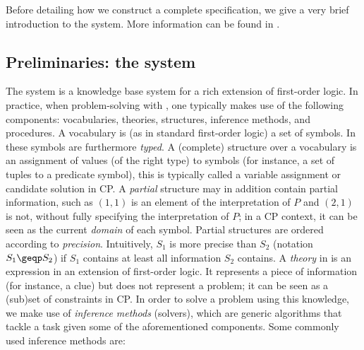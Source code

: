 Before detailing how we construct a complete specification, we give a very brief introduction to the \idp system. More information can be found in . 
\subsection{Preliminaries: the \idp system} 
The \idp system  is a knowledge base system  for a rich extension of first-order logic. 
In practice, when problem-solving with \idp, one typically makes use of the following components: vocabularies, theories, structures, inference methods, and procedures.
A vocabulary is (as in standard first-order logic) a set of symbols. In \idp these symbols are furthermore \emph{typed}. 
A (complete) structure over a vocabulary is an assignment of values (of the right type) to symbols (for instance, a set of tuples to a predicate symbol), this is typically called a variable assignment or candidate solution in CP. A \emph{partial} structure may in addition contain partial information, such as $(1,1)$ is an element of the interpretation of $P$ and $(2,1)$ is not, without fully specifying the interpretation of $P$; in a CP context, it can be seen as the current \textit{domain} of each symbol. 
Partial structures are ordered according to \emph{precision}. Intuitively, $S_1$ is more precise than $S_2$ (notation $S_1\geqp S_2$) if $S_1$ contains at least all information $S_2$ contains. 
A \emph{theory} in \idp is an expression in an extension of first-order logic. It represents a piece of information (for instance, a clue) but does not represent a problem; it can be seen as a (sub)set of constraints in CP. 
In order to solve a problem using this knowledge, we make use of \emph{inference methods} (solvers), which are generic algorithms that tackle a task given some of the aforementioned components. Some commonly used inference methods are:
